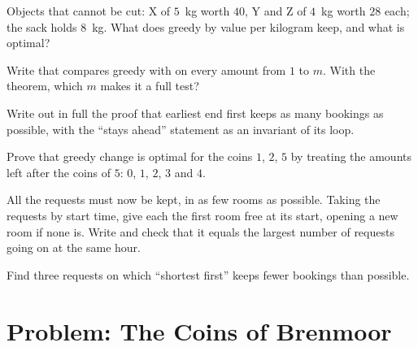 \begin{exercise}[$\star\star$]\label{exo:g11:greedy-algorithms:10}
Objects that cannot be cut: X of $5$~kg worth $40$, Y and Z of $4$~kg worth $28$ each; the sack holds $8$~kg. What does
greedy by value per kilogram keep, and what is optimal?
\end{exercise}

\begin{exercise}[$\star\star$]\label{exo:g11:greedy-algorithms:11}
Write  that compares greedy with  on every amount from $1$ to $m$. With
the theorem, which $m$ makes it a full test?
\end{exercise}

\begin{exercise}[$\star\star\star$]\label{exo:g11:greedy-algorithms:12}
Write out in full the proof that earliest end first keeps as many bookings as possible, with the ``stays ahead''
statement as an invariant of its loop.
\end{exercise}

\begin{exercise}[$\star\star\star$]\label{exo:g11:greedy-algorithms:13}
Prove that greedy change is optimal for the coins $1$, $2$, $5$ by treating the amounts left after the coins of $5$:
$0$, $1$, $2$, $3$ and $4$.
\end{exercise}

\begin{exercise}[$\star\star\star$]\label{exo:g11:greedy-algorithms:14}
All the requests must now be kept, in as few rooms as possible. Taking the requests by start time, give each the first
room free at its start, opening a new room if none is. Write  and check that it equals the
largest number of requests going on at the same hour.
\end{exercise}

\begin{exercise}[$\star\star\star$]\label{exo:g11:greedy-algorithms:15}
Find three requests on which ``shortest first'' keeps fewer bookings than possible.
\end{exercise}

\section{Problem: The Coins of Brenmoor}\label{sec:g11:greedy-algorithms:problem}

